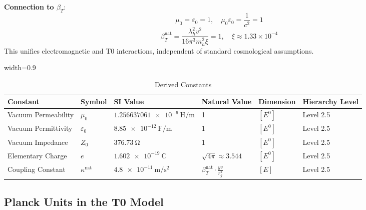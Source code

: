 \documentclass[12pt,a4paper]{article}
\newcommand{\tablescale}{0.9}
\begin{document}
	\textbf{Connection to \(\beta_T\)}:
	\[
	\mu_0 = \varepsilon_0 = 1, \quad \mu_0 \varepsilon_0 = \frac{1}{c^2} = 1
	\]
	\[
	\beta_T^{\text{nat}} = \frac{\lambda_h^2 v^2}{16 \pi^3 m_h^2 \xi} = 1, \quad \xi \approx 1.33 \times 10^{-4}
	\]
	This unifies electromagnetic and T0 interactions, independent of standard cosmological assumptions.
	
	\begin{table}[htbp]
		\centering
		\begin{adjustbox}{width=\tablescale\textwidth}
			\begin{tabular}{llllll}
				\toprule
				\textbf{Constant} & \textbf{Symbol} & \textbf{SI Value} & \textbf{Natural Value} & \textbf{Dimension} & \textbf{Hierarchy Level} \\
				\midrule
				Vacuum Permeability & \(\mu_0\) & \(\SI{1.256637061e-6}{\henry\per\meter}\) & 1 & \([E^0]\) & Level 2.5 \\
				Vacuum Permittivity & \(\varepsilon_0\) & \(\SI{8.85e-12}{\farad\per\meter}\) & 1 & \([E^0]\) & Level 2.5 \\
				Vacuum Impedance & \(Z_0\) & \(\SI{376.73}{\ohm}\) & 1 & \([E^0]\) & Level 2.5 \\
				Elementary Charge & \(e\) & \(\SI{1.602e-19}{\coulomb}\) & \(\sqrt{4\pi} \approx 3.544\) & \([E^0]\) & Level 2.5 \\
				Coupling Constant & \(\kappa^{\text{nat}}\) & \(\SI{4.8e-11}{\meter\per\second\squared}\) & \(\beta_T^{\text{nat}} \cdot \frac{y v}{r_g^2}\) & \([E]\) & Level 2.5 \\
				\bottomrule
			\end{tabular}
		\end{adjustbox}
		\caption{Derived Constants}
		\label{tab:em_const}
	\end{table}
	
	\subsection{Planck Units in the T0 Model}
	\label{subsec:planck_units}
	
\end{document}
